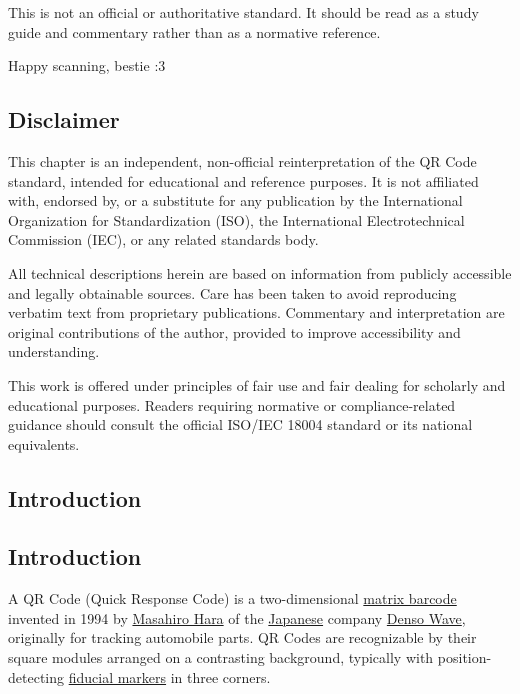 \documentclass[../main]{subfiles}
\begin{document}
This is not an official or authoritative standard. It should be read as a study guide and commentary rather than as a normative reference.


Happy scanning, bestie :3

\subsection{Disclaimer}

This chapter is an independent, non-official reinterpretation of the QR Code standard, intended for educational and reference purposes. 
It is not affiliated with, endorsed by, or a substitute for any publication by the International Organization for Standardization (ISO), the International Electrotechnical Commission (IEC), or any related standards body.  

All technical descriptions herein are based on information from publicly accessible and legally obtainable sources.  Care has been taken to avoid reproducing verbatim text from proprietary publications.  Commentary and interpretation are original contributions of the author, provided to improve accessibility and understanding.  

This work is offered under principles of fair use and fair dealing for scholarly and educational purposes. Readers requiring normative or compliance-related guidance should consult the official ISO/IEC 18004 standard or its national equivalents.


\subsection{Introduction}

\subsection{Introduction}

A QR Code (Quick Response Code) is a two-dimensional \href{https://en.wikipedia.org/wiki/Barcode\#Matrix_(2D)_codes}{matrix
barcode} invented in 1994 by \href{https://en.wikipedia.org/wiki/Masahiro_Hara}{Masahiro Hara} of the \href{https://en.wikipedia.org/wiki/Japan}{Japanese} company \href{https://en.wikipedia.org/wiki/Denso\#DENSO_Wave}{Denso Wave}, originally for tracking automobile parts. 
QR Codes are recognizable by their square modules arranged on a contrasting background, typically with position-detecting \href{https://en.wikipedia.org/wiki/Fiducial_markers}{fiducial markers} in three corners.  
\end{document}
